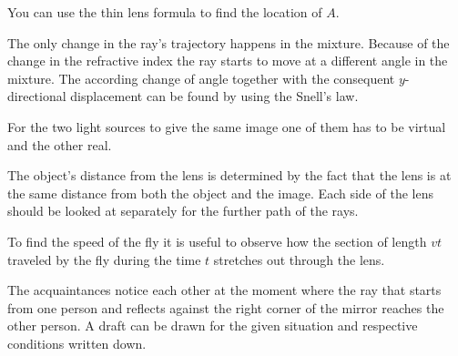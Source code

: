 \documentclass[11pt]{article}
\begin{document}
\hinteng
You can use the thin lens formula to find the location of $A$.
\probend
\bigskip


\hinteng
The only change in the ray’s trajectory happens in the mixture. Because of the change in the refractive index the ray starts to move at a different angle in the mixture. The according change of angle together with the consequent $y$-directional displacement can be found by using the Snell's law.
\probend
\bigskip


\hinteng
For the two light sources to give the same image one of them has to be virtual and the other real.
\probend
\bigskip


\hinteng
The object's distance from the lens is determined by the fact that the lens is at the same distance from both the object and the image. Each side of the lens should be looked at separately for the further path of the rays.
\probend
\bigskip


\hinteng
To find the speed of the fly it is useful to observe how the section of length $vt$ traveled by the fly during the time $t$ stretches out through the lens.
\probend
\bigskip


\hinteng
The acquaintances notice each other at the moment where the ray that starts from one person and reflects against the right corner of the mirror reaches the other person. A draft can be drawn for the given situation and respective conditions written down.
\probend
\bigskip

\end{document}

